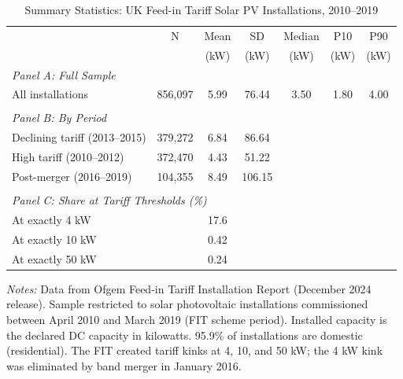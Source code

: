 \begin{table}[t]
\centering
\caption{Summary Statistics: UK Feed-in Tariff Solar PV Installations, 2010--2019}
\label{tab:summary}
\begin{tabular}{lcccccc}
\toprule
 & N & Mean & SD & Median & P10 & P90 \\
 & & (kW) & (kW) & (kW) & (kW) & (kW) \\
\midrule
\multicolumn{7}{l}{\textit{Panel A: Full Sample}} \\
All installations & 856,097 & 5.99 & 76.44 & 3.50 & 1.80 & 4.00 \\
 & & & & & & \\
\multicolumn{7}{l}{\textit{Panel B: By Period}} \\
Declining tariff (2013--2015) & 379,272 & 6.84 & 86.64 & & & \\
High tariff (2010--2012) & 372,470 & 4.43 & 51.22 & & & \\
Post-merger (2016--2019) & 104,355 & 8.49 & 106.15 & & & \\
 & & & & & & \\
\multicolumn{7}{l}{\textit{Panel C: Share at Tariff Thresholds (\%)}} \\
At exactly 4 kW & & 17.6 & & & & \\
At exactly 10 kW & & 0.42 & & & & \\
At exactly 50 kW & & 0.24 & & & & \\
\bottomrule
\end{tabular}
\par\vspace{0.3em}\begin{flushleft}\small
\textit{Notes:} Data from Ofgem Feed-in Tariff Installation Report (December 2024 release). Sample restricted to solar photovoltaic installations commissioned between April 2010 and March 2019 (FIT scheme period). Installed capacity is the declared DC capacity in kilowatts. 95.9\% of installations are domestic (residential). The FIT created tariff kinks at 4, 10, and 50 kW; the 4 kW kink was eliminated by band merger in January 2016.
\end{flushleft}
\end{table}

